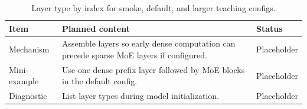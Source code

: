 \begin{table}[H]
\centering
\caption{Layer type by index for smoke, default, and larger teaching configs.}
\label{tab:ch10-decoder-block-with-dense-prefix-and-moe-layers}
\begin{tabularx}{\textwidth}{p{}X p{}}
\toprule
Item & Planned content & Status \\
\midrule
Mechanism & Assemble layers so early dense computation can precede sparse MoE layers if configured. & Placeholder \\
Mini-example & Use one dense prefix layer followed by MoE blocks in the default config. & Placeholder \\
Diagnostic & List layer types during model initialization. & Placeholder \\
\bottomrule
\end{tabularx}
\end{table}
